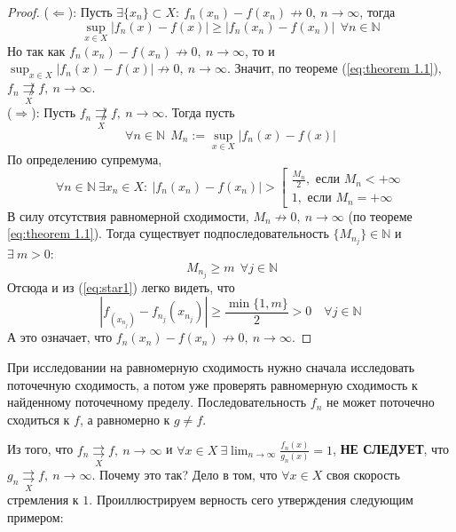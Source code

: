 \documentclass[11pt]{article}
\begin{document}
\begin{proof}
    ($\Longleftarrow$): Пусть $\exists \{x_n\} \subset X: \ f_n(x_n) - f(x_n) \not\to 0, \ n \to \infty$, тогда \[\sup_{x \in X} |f_n(x) - f(x)| \geq |f_n(x_n) - f(x_n)| \ \
    \forall n \in \mathbb{N}\]
    Но так как $f_n(x_n) - f(x_n) \not\to 0, \ n \to \infty$, то и $\displaystyle \sup_{x \in X} |f_n(x) - f(x)| \not\to 0, \ n \to \infty$. Значит, по теореме (\ref{eq:theorem 1.1}), 
    $\displaystyle f_n \underset{X}{\not\rightrightarrows} f, \ n \to \infty$.\\
    ($\Longrightarrow$): Пусть $f_n \underset{X}{\not\rightrightarrows} f, \ n \to \infty$. Тогда пусть \[\forall n \in \mathbb{N} \ \ M_n := \sup_{x \in X} |f_n(x) - f(x)|\]
    По определению супремума, \[\forall n \in \mathbb{N} \ \exists x_n \in X: \  |f_n(x_n) - f(x_n)| > \left[\begin{array}{l}
        \displaystyle \frac{M_n}{2}, \text{ если } M_n < +\infty \\ \displaystyle 1, \text{ если } M_n = +\infty
    \end{array}\right. \label{eq:star1} \tag{*}\]
    В силу отсутствия равномерной сходимости, $M_n \not\to 0, \ n \to \infty$ (по теореме \ref{eq:theorem 1.1}). Тогда существует подпоследовательность $\{M_{n_j}\} \in \mathbb{N}$
    и $\exists \ m > 0:$ \[\ M_{n_j} \geq m \ \ \forall j \in \mathbb{N}\] Отсюда и из (\ref{eq:star1}) легко видеть, что \[|f_(x_{n_j}) - f_{n_j}(x_{n_j})| \geq \frac{\min \{1, m\}}{2} > 0 \quad \forall j \in \mathbb{N}\]
    А это означает, что $f_n(x_n) - f(x_n) \not\to 0, \ n \to \infty$.
\end{proof}

\begin{remark}
    При исследовании на равномерную сходимость нужно сначала исследовать поточечную сходимость, а потом уже проверять равномерную сходимость к найденному поточечному пределу.
    Последовательность $f_n$ не может поточечно сходиться к $f$, а равномерно к $g \neq f$.
\end{remark}

\begin{remark}
    Из того, что $\displaystyle f_n \underset{X}{\rightrightarrows} f, \ n \to \infty$ и $\displaystyle \forall x \in X \ \exists \lim_{n \to \infty} \frac{f_n(x)}{g_n(x)} = 1$, 
    \textbf{НЕ СЛЕДУЕТ}, что $ g_n \underset{X}{\rightrightarrows} f, \ n \to \infty$. Почему это так? Дело в том, что $\forall x \in X$ своя скорость стремления к $1$. Проиллюстрируем
    верность сего утверждения следующим примером:
\end{remark}
\end{document}
